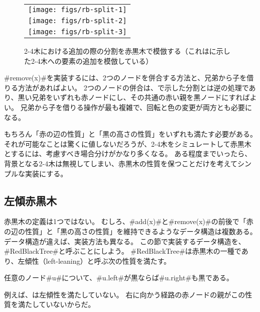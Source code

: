 \begin{figure}
  \begin{center}
   \begin{tabular}{c}
     \texttt{[image: figs/rb-split-1]} \\
     \texttt{[image: figs/rb-split-2]} \\
     \texttt{[image: figs/rb-split-3]} \\
   \end{tabular}
  \end{center}
  \caption{2-4木における追加の際の分割を赤黒木で模倣する（これはに示した2-4木への要素の追加を模倣している）}
\end{figure}

#remove(x)#を実装するには、2つのノードを併合する方法と、兄弟から子を借りる方法があればよい。
2つのノードの併合は、で示した分割とは逆の処理であり、黒い兄弟をいずれも赤ノードにし、その共通の赤い親を黒ノードにすればよい。
兄弟から子を借りる操作が最も複雑で、回転と色の変更が両方とも必要になる。

もちろん「赤の辺の性質」と「黒の高さの性質」をいずれも満たす必要がある。
それが可能なことは驚くに値しないだろうが、2-4木をシミュレートして赤黒木とするには、考慮すべき場合分けがかなり多くなる。
ある程度までいったら、背景となる2-4木は無視してしまい、赤黒木の性質を保つことだけを考えてシンプルな実装にする。

\subsection{左傾赤黒木}

%
%
赤黒木の定義は1つではない。
むしろ、#add(x)#と#remove(x)#の前後で「赤の辺の性質」と「黒の高さの性質」を維持できるようなデータ構造は複数ある。
データ構造が違えば、実装方法も異なる。
この節で実装するデータ構造を、#RedBlackTree#と呼ぶことにしよう。
%
#RedBlackTree#は赤黒木の一種であり、左傾性（left-leaning）と呼ぶ次の性質を満たす。
\begin{prp}[左傾性]
  任意のノード#u#について、#u.left#が黒ならば#u.right#も黒である。
\end{prp}
例えば、は左傾性を満たしていない。
右に向かう経路の赤ノードの親がこの性質を満たしていないからだ。

